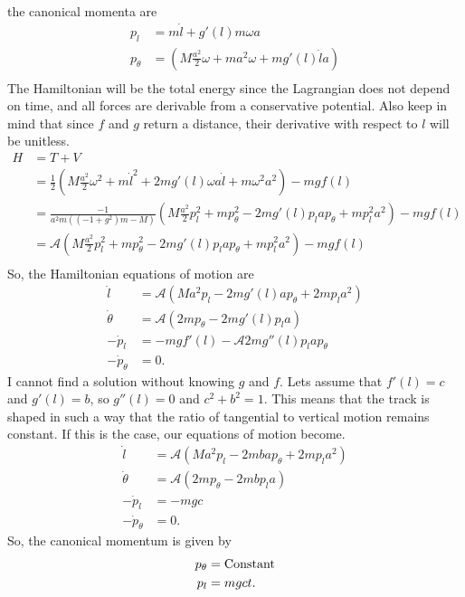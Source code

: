 \documentclass[10pt]{article}
\begin{document}
the canonical momenta are
\begin{align*}
  p_l &= m\dot l + g'(l)m\omega a\\
  p_{\theta} &= \left( M\frac{a^2}{2}\omega+ma^2\omega+mg'(l)\dot la \right)\\
\end{align*}
The Hamiltonian will be the total energy since the Lagrangian does not depend on time, and all forces are derivable
from a conservative potential.  Also keep in mind that since $f$ and $g$ return a distance, their derivative with
respect to $l$ will be unitless.
\begin{align*}
  H &= T+V\\
    &= \frac{1}{2} \left( M\frac{a^2}{2}\omega^2+m\dot l^2 + 2mg'(l)\omega a\dot l + m\omega^2 a^2 \right)-mgf(l)\\
    &= \frac{-1}{a^2 m ((-1 + g^2) m - M) } \left( M\frac{a^2}{2}p_l^2+mp_{\theta}^2 - 2mg'(l)p_l ap_{\theta} +m p_l^2 a^2 \right)-mgf(l)\\
    &= \mathcal{A} \left( M\frac{a^2}{2}p_l^2+mp_{\theta}^2 - 2mg'(l)p_l ap_{\theta} +m p_l^2 a^2 \right)-mgf(l)\\
\end{align*}
So, the Hamiltonian equations of motion are
\begin{align*}
  \dot l &= \mathcal{A} \left( Ma^2p_l - 2mg'(l) ap_{\theta} +2m p_l a^2 \right)\\
  \dot \theta &= \mathcal{A} \left( 2mp_{\theta} - 2mg'(l)p_l a \right)\\
  -\dot p_l &= -mgf'(l) - \mathcal{A}2mg''(l)p_l ap_{\theta}\\
  -\dot p_{\theta} &= 0.
\end{align*}
I cannot find a solution without knowing $g$ and $f$.  Lets assume that $f'(l)=c$ and $g'(l)=b$, so 
$g''(l)=0$ and $c^2+b^2=1$.  This means that the track is shaped in such a way that the ratio of
tangential to vertical motion remains constant.  If this is the case, our equations of motion become.
\begin{align*}
  \dot l &= \mathcal{A} \left( Ma^2p_l - 2mb ap_{\theta} +2m p_l a^2 \right)\\
  \dot \theta &= \mathcal{A} \left( 2mp_{\theta} - 2mbp_l a \right)\\
  -\dot p_l &= -mgc\\
  -\dot p_{\theta} &= 0.
\end{align*}
So, the canonical momentum is given by
\begin{align*}
  p_{\theta} &= \rm{Constant}\\
  p_l &= mgct.
\end{align*}
\end{document}
